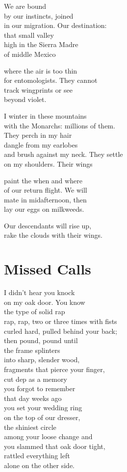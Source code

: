 \documentclass[twoside,10pt]{book}
\begin{document}
We are bound\\
by our instincts, joined\\
in our migration. Our destination:\\
that small valley\\
high in the Sierra Madre\\
of middle Mexico

where the air is too thin\\
for entomologists. They cannot\\
track wingprints or see\\
beyond violet.

I winter in these mountains\\
with the Monarchs: millions of them.\\
They perch in my hair\\
dangle from my earlobes\\
and brush against my neck. They settle\\
on my shoulders. Their wings

paint the when and where\\
of our return flight. We will\\
mate in midafternoon, then\\
lay our eggs on milkweeds.

Our descendants will rise up,\\
rake the clouds with their wings.


\clearpage
\section{Missed Calls}

I didn't hear you knock\\
on my oak door. You know\\
the type of solid rap\\
rap, rap, two or three times with fists\\
curled hard, pulled behind your back;\\
then pound, pound until\\
the frame splinters\\
into sharp, slender wood,\\
fragments that pierce your finger,\\
cut dep as a memory\\
you forgot to remember\\
that day weeks ago\\
you set your wedding ring\\
on the top of our dresser,\\
the shiniest circle\\
among your loose change and\\
you slammed that oak door tight,\\
rattled everything left\\
alone on the other side.
\end{document}
